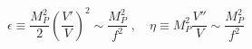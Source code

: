 \begin{equation}
\label{eq:slow}
\epsilon \equiv \frac{M_P^2}{2}\left(\frac{V'}{V}\right)^2 \sim
\frac{M_P^2}{f^2} \;, \quad \eta \equiv M_P^2 \frac{V''}{V} \sim
\frac{M_P^2}{f^2}
\end{equation}

